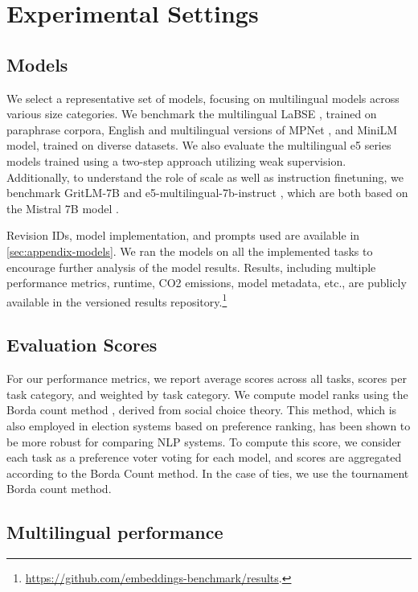 \section{Experimental Settings}

\subsection{Models} 
\label{sec:models}

We select a representative set of models, focusing on multilingual models across various size categories. We benchmark the multilingual LaBSE \citep{feng-etal-2022-language}, trained on paraphrase corpora, English and multilingual versions of MPNet \citep{song2020mpnet}, and MiniLM \citep{wang-etal-2021-minilmv2} model, trained on diverse datasets. We also evaluate the multilingual e5 series models \citep{wang2024multilingual, wang2022text} trained using a two-step approach utilizing weak supervision. Additionally, to understand the role of scale as well as instruction finetuning, we benchmark GritLM-7B \citep{muennighoff2024generative} and e5-multilingual-7b-instruct \citep{wang2023improving}, which are both based on the Mistral 7B model \citep{jiang2023mistral}.

Revision IDs, model implementation, and prompts used are available in \autoref{sec:appendix-models}. We ran the models on all the implemented tasks to encourage further analysis of the model results.
Results, including multiple performance metrics, runtime, CO2 emissions, model metadata, etc., are publicly available in the versioned results repository.\footnote{\url{https://github.com/embeddings-benchmark/results}.}

\subsection{Evaluation Scores}
For our performance metrics, we report average scores across all tasks, scores per task category, and weighted by task category. We compute model ranks using the Borda count method \citep{NEURIPS2022_ac4920f4}, derived from social choice theory. This method, which is also employed in election systems based on preference ranking, has been shown to be more robust for comparing NLP systems. To compute this score, we consider each task as a preference voter voting for each model, and scores are aggregated according to the Borda Count method. In the case of ties, we use the tournament Borda count method.

\subsection{Multilingual performance} 

